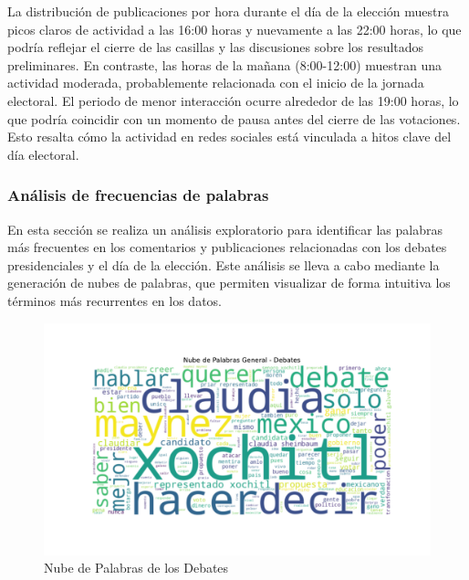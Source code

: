 \documentclass[10pt, a4paper]{article}
\begin{document}
	La distribución de publicaciones por hora durante el día de la elección muestra picos claros de actividad a las 16:00 horas y nuevamente a las 22:00 horas, lo que podría reflejar el cierre de las casillas y las discusiones sobre los resultados preliminares. En contraste, las horas de la mañana (8:00-12:00) muestran una actividad moderada, probablemente relacionada con el inicio de la jornada electoral. El periodo de menor interacción ocurre alrededor de las 19:00 horas, lo que podría coincidir con un momento de pausa antes del cierre de las votaciones. Esto resalta cómo la actividad en redes sociales está vinculada a hitos clave del día electoral.
	
	
	\subsubsection{Análisis de frecuencias de palabras}
	
	En esta sección se realiza un análisis exploratorio para identificar las palabras más frecuentes en los comentarios y publicaciones relacionadas con los debates presidenciales y el día de la elección. Este análisis se lleva a cabo mediante la generación de nubes de palabras, que permiten visualizar de forma intuitiva los términos más recurrentes en los datos.
	
	\vspace{-4mm}
	\begin{figure}[h!]
		\centering
		\includegraphics[width=1\textwidth]{nube_palabras_general.pdf} %
		\vspace{-22mm}
		\caption{Nube de Palabras de los Debates}
		\label{fig:nubeGralDebates} %
	\end{figure}
	
\end{document}
